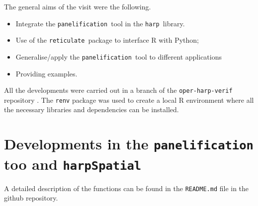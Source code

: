\documentclass[11pt,a4paper]{article}
\newcommand{\retis}{\texttt{reticulate }}
\newcommand{\panels}{\texttt{panelification }}
\newcommand{\harps}{\texttt{harp }}
\newcommand{\harpss}{\texttt{harpSpatial }}
\newcommand {\sectionrule}{\vskip -0.9 cm
\color {mygray} \rule [0 cm] {17 cm}{0.1 mm} \color {black}}
\begin{document}
The general aims of the visit were the following.
\begin{itemize}
    \item Integrate the \panels tool in the \harps library.
    \item Use of the \retis package to interface R with Python;
    \item Generalise/apply the \panels tool to different applications
    \item Providing examples.
\end{itemize}

All the developments were carried out in a branch of the \texttt{oper-harp-verif} repository \cite{oper-harp}.
The \texttt{renv} package was used to create a local R environment where all
the necessary libraries and dependencies can be installed.

\section{Developments in the \panels too and \harpss}


A detailed description of the functions can be found in the \texttt{README.md} file
in the github repository. 
\end{document}
